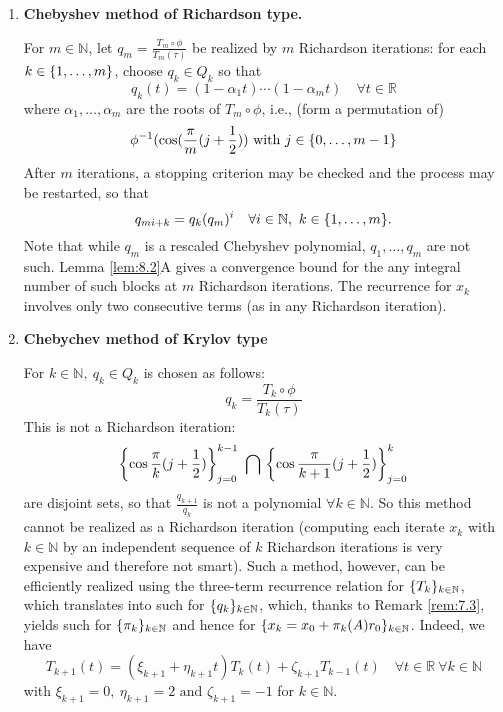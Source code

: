 \documentclass[12pt]{article}
\theoremstyle{definition}
\theoremstyle{remark}
\numberwithin{equation}{section}
\newcommand{\R}{\mathbb{R}}
\newcommand{\N}{\mathbb{N}}
\DeclarePairedDelimiter{\set}{\{}{\}}
\begin{document}
\begin{enumerate}[label=(\roman*)]
  \item \textbf{Chebyshev method of Richardson type.}

    For $m \in \N$, let $q_m = \frac{T_m \circ \phi}{T_m(\tau)}$ be realized by $m$ Richardson iterations: for each $k \in \set{1,\ldots,m}$, choose $q_k \in Q_k$ so that
    \begin{equation*}
      q_k(t) = (1 - \alpha_1 t) \cdots (1 - \alpha_m t) \quad \forall t \in \R
    \end{equation*}
    where $\alpha_1, \ldots, \alpha_m$ are the roots of $T_m \circ \phi$, i.e., (form a permutation of)
    \begin{equation*}
      {\phi}^{-1}(\cos(\frac{\pi}{m} (j + \frac{1}{2})) \text{ with } j \in \set{0,\ldots,m-1}
      \end{equation*}
      After $m$ iterations, a stopping criterion may be checked and the process may be restarted, so that
      \begin{equation*}
        q_{mi+k} = q_k (q_m)^i \quad \forall i \in \N,\ k \in \set{1,\ldots,m}.
      \end{equation*}
      Note that while $q_m$ is a rescaled Chebyshev polynomial, $q_1, \ldots, q_m$ are not such. Lemma \ref{lem:8.2}A gives a convergence bound for the any integral number of such blocks at $m$ Richardson iterations. The recurrence for $x_k$ involves only two consecutive terms (as in any Richardson iteration).
    \item \textbf{Chebychev method of Krylov type}

      For $k \in \N,\ q_k \in Q_k$ is chosen as follows:
      \begin{equation*}
        q_k = \frac{T_k \circ \phi}{T_k(\tau)}
      \end{equation*}
      This is not a Richardson iteration:
      \begin{equation*}
        \set*{\cos\frac{\pi}{k}(j+\frac{1}{2})}_{j=0}^{k-1}\ \bigcap\  \set*{\cos\frac{\pi}{k+1}(j+\frac{1}{2})}_{j=0}^{k}
      \end{equation*}
      are disjoint sets, so that $\frac{q_{k+1}}{q_k}$ is not a polynomial $\forall k \in \N$. So this method cannot be realized as a Richardson iteration (computing each iterate $x_k$ with $k \in \N$ by an independent sequence of $k$ Richardson iterations is very expensive and therefore not smart). Such a method, however, can be efficiently realized using the three-term recurrence relation for $\set{T_k}_{k \in \N}$, which translates into such for $\set{q_k}_{k \in \N}$, which, thanks to Remark \ref{rem:7.3}, yields such for $\set{\pi_k}_{k \in \N}$ and hence for $ \set{x_k=x_0 + \pi_k(A) r_0}_{k \in \N}$. Indeed, we have
      \begin{equation*}
        T_{k+1}(t)=(\xi_{k+1} + \eta_{k+1} t) T_k(t) + \zeta_{k+1} T_{k-1}(t) \quad \forall t \in \R\ \forall k \in \N
      \end{equation*}
      with $\xi_{k+1} = 0,\ \eta_{k+1} = 2 \text{ and } \zeta_{k+1} = -1$ for $k \in \N$.


\end{enumerate}
\end{document}
